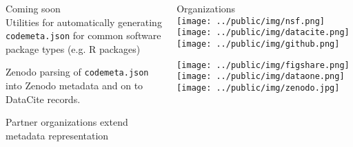 \documentclass[final,hyperref={pdfpagelabels=false},xcolor=svgnames]{beamer}
\begin{document}
\begin{frame}[t,fragile]
\begin{columns}[t]
\begin{column}{.33\paperwidth}
  \vspace{1cm}
  { \LARGE Coming soon} \\

  Utilities for automatically generating \texttt{codemeta.json} for common software package types (e.g. R packages)

  Zenodo parsing of \texttt{codemeta.json} into Zenodo metadata and on to DataCite records.

  Partner organizations extend metadata representation



  \end{column}
  \begin{column}{.33\paperwidth}
        {\LARGE Organizations} \\
        \texttt{[image: ../public/img/nsf.png]}\hspace{1cm}	
         \texttt{[image: ../public/img/datacite.png]}\hspace{1cm}		
         \texttt{[image: ../public/img/github.png]}	

         \texttt{[image: ../public/img/figshare.png]}\hspace{1cm}		
         \texttt{[image: ../public/img/dataone.png]}\hspace{1cm}		
         \texttt{[image: ../public/img/zenodo.jpg]}	
         

\end{column}
\end{columns}
\end{frame}
\end{document}
